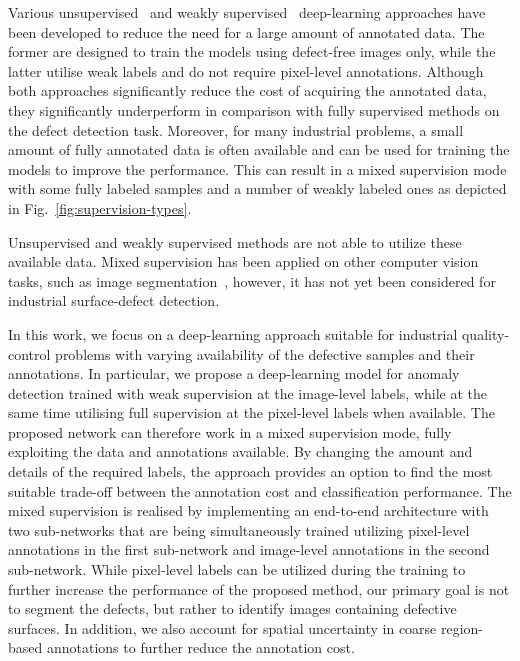 Various unsupervised~\cite{Staar2018,uninformedStudents,Zavrtanik2020} and weakly supervised~\cite{Lin2018,CADN,Zhu2019} deep-learning approaches have been developed to reduce the need for a large amount of annotated data. The former are designed to train the models using defect-free images only, while the latter utilise weak labels and do not require pixel-level annotations. 
Although both approaches significantly reduce the cost of acquiring the annotated data, they significantly underperform in comparison with fully supervised methods on the defect detection task. Moreover, for many industrial problems, a small amount of fully annotated data is often available and can be used for training the models to improve the performance. This can result in a mixed supervision mode with some fully labeled samples and a number of weakly labeled ones as depicted in Fig.~\ref{fig:supervision-types}.

Unsupervised and weakly supervised methods are not able to utilize these available data. Mixed supervision has been applied on other computer vision tasks, such as image segmentation~\cite{Souly2017,Mlynarski2019}, however, it has not yet been considered for industrial surface-defect detection.

In this work, we focus on a deep-learning approach suitable for industrial quality-control problems with varying availability of the defective samples and their annotations. In particular, we propose a deep-learning model for anomaly detection trained with weak supervision at the image-level labels, while at the same time utilising full supervision at the pixel-level labels when available. The proposed network can therefore work in a mixed supervision mode, fully exploiting the data and annotations available. By changing the amount and details of the required labels, the approach provides an option to find the most suitable trade-off between the annotation cost and classification performance. The mixed supervision is realised by implementing an end-to-end architecture with two sub-networks that are being simultaneously trained utilizing pixel-level annotations in the first sub-network and image-level annotations in the second sub-network.
While pixel-level labels can be utilized during the training to further increase the performance of the proposed method, our primary goal is not to segment the defects, but rather to identify images containing defective surfaces. In addition, we also account for spatial uncertainty in coarse region-based annotations to further reduce the annotation cost.

